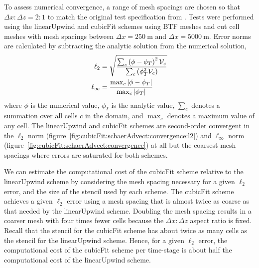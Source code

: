 To assess numerical convergence, a range of mesh spacings are chosen so that $\Delta x \mathbin{:} \Delta z = 2\mathbin{:}1$ to match the original test specification from \citet{schaer2002}.
Tests were performed using the linearUpwind and cubicFit schemes using BTF meshes and cut cell meshes with mesh spacings between $\Delta x = \SI{250}{\meter}$ and $\Delta x = \SI{5000}{\meter}$.
Error norms are calculated by subtracting the analytic solution from the numerical solution,
\begin{align}
	\ell_2 &= \sqrt{\frac{\sum_c \left(\phi - \phi_T \right)^2 \mathcal{V}_c}{\sum_c \left(\phi_T^2 \mathcal{V}_c \right)}} \label{eqn:l2-error} \\
	\ell_\infty &= \frac{\max_c \left\lvert \phi - \phi_T \right\rvert}{\max_c \left\lvert \phi_T \right\rvert} \label{eqn:linf-error}
\end{align}
where $\phi$ is the numerical value, $\phi_T$ is the analytic value, $\sum_c$ denotes a summation over all cells $c$ in the domain, and $\max_c$ denotes a maximum value of any cell.
The linearUpwind and cubicFit schemes are second-order convergent in the $\ell_2$ norm (figure~\ref{fig:cubicFit:schaerAdvect:convergence:l2}) and $\ell_\infty$ norm (figure~\ref{fig:cubicFit:schaerAdvect:convergence}) at all but the coarsest mesh spacings where errors are saturated for both schemes.

We can estimate the computational cost of the cubicFit scheme relative to the linearUpwind scheme by considering the mesh spacing necessary for a given $\ell_2$ error, and the size of the stencil used by each scheme.
The cubicFit scheme achieves a given $\ell_2$ error using a mesh spacing that is almost twice as coarse as that needed by the linearUpwind scheme.  Doubling the mesh spacing results in a coarser mesh with four times fewer cells because the $\Delta x \mathbin{:} \Delta z$ aspect ratio is fixed.
Recall that the stencil for the cubicFit scheme has about twice as many cells as the stencil for the linearUpwind scheme.
Hence, for a given $\ell_2$ error, the computational cost of the cubicFit scheme per time-stage is about half the computational cost of the linearUpwind scheme.

